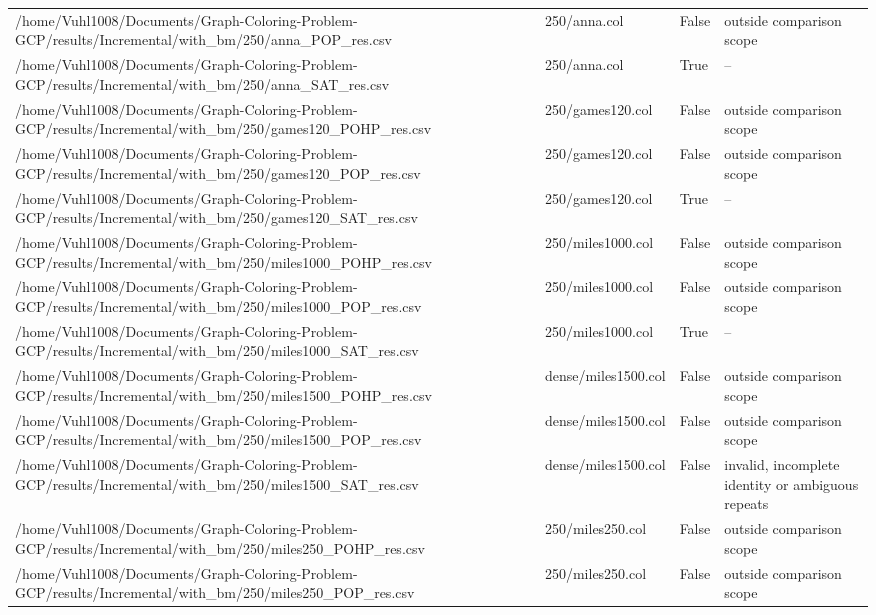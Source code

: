 \begin{table}[htbp]
\begin{tabular}{llll}
/home/Vuhl1008/Documents/Graph-Coloring-Problem-GCP/results/Incremental/with\_bm/250/anna\_POP\_res.csv & 250/anna.col & False & outside comparison scope \\
/home/Vuhl1008/Documents/Graph-Coloring-Problem-GCP/results/Incremental/with\_bm/250/anna\_SAT\_res.csv & 250/anna.col & True & -- \\
/home/Vuhl1008/Documents/Graph-Coloring-Problem-GCP/results/Incremental/with\_bm/250/games120\_POHP\_res.csv & 250/games120.col & False & outside comparison scope \\
/home/Vuhl1008/Documents/Graph-Coloring-Problem-GCP/results/Incremental/with\_bm/250/games120\_POP\_res.csv & 250/games120.col & False & outside comparison scope \\
/home/Vuhl1008/Documents/Graph-Coloring-Problem-GCP/results/Incremental/with\_bm/250/games120\_SAT\_res.csv & 250/games120.col & True & -- \\
/home/Vuhl1008/Documents/Graph-Coloring-Problem-GCP/results/Incremental/with\_bm/250/miles1000\_POHP\_res.csv & 250/miles1000.col & False & outside comparison scope \\
/home/Vuhl1008/Documents/Graph-Coloring-Problem-GCP/results/Incremental/with\_bm/250/miles1000\_POP\_res.csv & 250/miles1000.col & False & outside comparison scope \\
/home/Vuhl1008/Documents/Graph-Coloring-Problem-GCP/results/Incremental/with\_bm/250/miles1000\_SAT\_res.csv & 250/miles1000.col & True & -- \\
/home/Vuhl1008/Documents/Graph-Coloring-Problem-GCP/results/Incremental/with\_bm/250/miles1500\_POHP\_res.csv & dense/miles1500.col & False & outside comparison scope \\
/home/Vuhl1008/Documents/Graph-Coloring-Problem-GCP/results/Incremental/with\_bm/250/miles1500\_POP\_res.csv & dense/miles1500.col & False & outside comparison scope \\
/home/Vuhl1008/Documents/Graph-Coloring-Problem-GCP/results/Incremental/with\_bm/250/miles1500\_SAT\_res.csv & dense/miles1500.col & False & invalid, incomplete identity or ambiguous repeats \\
/home/Vuhl1008/Documents/Graph-Coloring-Problem-GCP/results/Incremental/with\_bm/250/miles250\_POHP\_res.csv & 250/miles250.col & False & outside comparison scope \\
/home/Vuhl1008/Documents/Graph-Coloring-Problem-GCP/results/Incremental/with\_bm/250/miles250\_POP\_res.csv & 250/miles250.col & False & outside comparison scope \\

\end{tabular}
\end{table}
